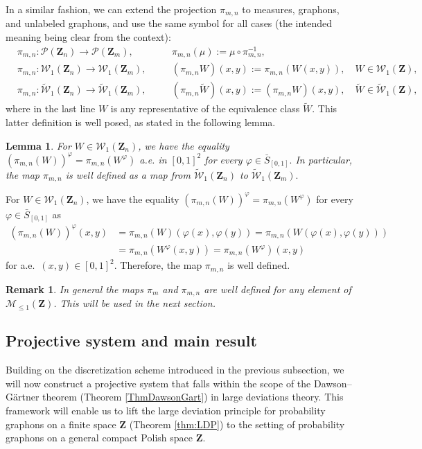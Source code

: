 \documentclass[12pt,twoside,a4paper]{article}
\newtheorem{lemma}[theorem]{Lemma}
\newtheorem{remark}[theorem]{Remark}
\newcommand{\Space}{\mathbf{Z}}
\newcommand{\Graphon}{\mathcal{W}_1}
\newcommand{\UGraphon}{\widetilde{\mathcal{W}}_1}
\newcommand{\Relabel}{\bar{S}_{[0,1]}}
\begin{document}
In a similar fashion, we can extend the projection $\pi_{m,n}$ to measures, graphons, and unlabeled graphons, and use the same symbol for all cases (the intended meaning being clear from the context):
\begin{align}
&\pi_{m,n} : \mathcal{P}(\Space_n) \to \mathcal{P}(\Space_m), \quad &&\pi_{m,n}(\mu) := \mu \circ \pi_{m,n}^{-1},\\
&\pi_{m,n} : \Graphon(\Space_n) \to \Graphon(\Space_m), \quad &&(\pi_{m,n}W)(x,y) := \pi_{m,n}(W(x,y)), \quad W \in \Graphon(\Space),\\
&\pi_{m,n} : \UGraphon(\Space_n) \to \UGraphon(\Space_m), \quad &&(\pi_{m,n}\widetilde{W})(x,y) := (\pi_{m,n}W)(x,y), \quad \widetilde{W} \in \UGraphon(\Space),
\end{align}
where in the last line $W$ is any representative of the equivalence class $\widetilde{W}$. This latter definition is well posed, as stated in the following lemma.


\begin{lemma}\label{lemm:RelabelPiMandn}
For $W\in \Graphon(\Space_n)$, we have the equality $(\pi_{m,n}(W))^{\varphi}=\pi_{m,n}(W^{\varphi})$ a.e. in $[0,1]^2$ for every $\varphi\in \Relabel .$ In particular, the map $\pi_{m,n}$ is well defined as a map from $\UGraphon(\Space_n)$ to $\UGraphon(\Space_m).$
\end{lemma}
\proof
For $W\in \Graphon(\Space_n)$, we have the equality $(\pi_{m,n}(W))^{\varphi}=\pi_{m,n}(W^{\varphi})$ for every $\varphi\in \Relabel $ as 
\[
\begin{split}
 (\pi_{m,n}(W))^{\varphi}(x,y)&=\pi_{m,n}(W)(\varphi(x),\varphi(y))=\pi_{m,n}(W(\varphi(x),\varphi(y)))\\&=\pi_{m,n}(W^{\varphi}(x,y))=\pi_{m,n}(W^{\varphi})(x,y)  
\end{split}
\] 
for a.e.\ $(x,y)\in [0,1]^2.$ Therefore, the map $\pi_{m,n}$ is well defined.
\endproof
\begin{remark}\label{rmk:proj_subprob}
    In general the maps $\pi_m$ and $\pi_{m,n}$ are well defined for any element of $\mathcal{M}_{\leq1}(\Space)$. This will be used in the next section.
\end{remark}
\subsection{Projective system and main result}\label{sec:proj_system}
Building on the discretization scheme introduced in the previous subsection, we will now construct a projective system that falls within the scope of the Dawson--Gärtner theorem (Theorem \ref{ThmDawsonGart}) in large deviations theory. This framework will enable us to lift the large deviation principle for probability graphons on a finite space $\Space$ (Theorem \ref{thm:LDP}) to the setting of probability graphons on a general compact Polish space $\Space$.
\end{document}
